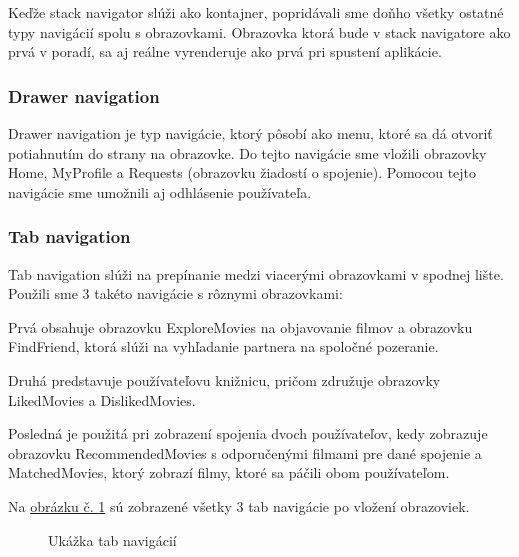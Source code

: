Keďže stack navigator slúži ako kontajner, popridávali sme doňho všetky ostatné typy navigácií spolu s obrazovkami. Obrazovka ktorá bude v stack navigatore ako prvá v poradí, sa aj reálne vyrenderuje ako prvá pri spustení aplikácie. 

\subsubsection{Drawer navigation}
Drawer navigation je typ navigácie, ktorý pôsobí ako menu, ktoré sa dá otvoriť potiahnutím do strany na obrazovke. Do tejto navigácie sme vložili obrazovky Home, MyProfile a Requests (obrazovku žiadostí o spojenie). Pomocou tejto navigácie sme umožnili aj odhlásenie používateľa.
\subsubsection{Tab navigation}
Tab navigation slúži na prepínanie medzi viacerými obrazovkami v spodnej lište. Použili sme 3 takéto navigácie s rôznymi obrazovkami: 
\begin{itemize}
{\item Prvá obsahuje obrazovku ExploreMovies na objavovanie filmov a obrazovku FindFriend, ktorá slúži na vyhľadanie partnera na spoločné pozeranie. } 
{\item Druhá predstavuje používateľovu knižnicu, pričom združuje obrazovky LikedMovies a DislikedMovies.} 
{\item Posledná je použitá pri zobrazení spojenia dvoch používateľov, kedy zobrazuje obrazovku RecommendedMovies s odporučenými filmami pre dané spojenie a MatchedMovies, ktorý zobrazí filmy, ktoré sa páčili obom používateľom.} 
\end{itemize}

Na \hyperref[tabnav]{obrázku č. \ref{tabnav}} sú zobrazené všetky 3 tab navigácie po vložení obrazoviek.

\begin{figure}[hbt!]
  \centering   
  \def\stackalignment{c}
           \scriptsize
	\caption{Ukážka tab navigácií}  
  \label{tabnav}
\end{figure}

